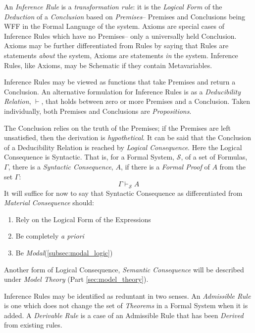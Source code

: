 \documentclass{article}
\begin{document}
An \emph{Inference Rule} is a \emph{transformation rule}: it is the
\emph{Logical Form} of the \emph{Deduction} of a \emph{Conclusion}
based on \emph{Premises}-- Premises and Conclusions being WFF in the
Formal Language of the system. Axioms are special cases of Inference
Rules which have no Premises-- only a universally held
Conclusion. Axioms may be further differentiated from Rules by saying
that Rules are statements \emph{about} the system, Axioms are
statements \emph{in} the system. Inference Rules, like Axioms, may be
Schematic if they contain Metavariables.

Inference Rules may be viewed as functions that take Premises and
return a Conclusion. An alternative formulation for Inference Rules is
as a \emph{Deducibility Relation}, $\vdash$, that holds between zero
or more Premises and a Conclusion. Taken individually, both Premises
and Conclusions are \emph{Propositions}.

The Conclusion relies on the truth of the Premises; if the Premises
are left unsatisfied, then the derivation is \emph{hypothetical}. It
can be said that the Conclusion of a Deducibility Relation is reached
by \emph{Logical Consequence}. Here the Logical Consequence is
Syntactic. That is, for a Formal System, $\mathcal{S}$, of a set of
Formulas, $\Gamma$, there is a \emph{Syntactic Consequence}, $A$, if
there is a \emph{Formal Proof} of $A$ from the set $\Gamma$: %
\[
    \Gamma \vdash_{\mathcal{S}} A
\]
It will suffice for now to say that Syntactic Consequence as
differentiated from \emph{Material Consequence} should: %
\begin{enumerate}
\item Rely on the Logical Form of the Expressions
\item Be completely \emph{a priori}
\item Be \emph{Modal}(\ref{subsec:modal_logic})
\end{enumerate}
Another form of Logical Consequence, \emph{Semantic Consequence} will
be described under \emph{Model Theory} (Part \ref{sec:model_theory}).

Inference Rules may be identified as reduntant in two senses. An
\emph{Admissible Rule} is one which does not change the set of
\emph{Theorems} in a Formal System when it is added. A \emph{Derivable
  Rule} is a case of an Admissible Rule that has been \emph{Derived}
from existing rules.
\end{document}
